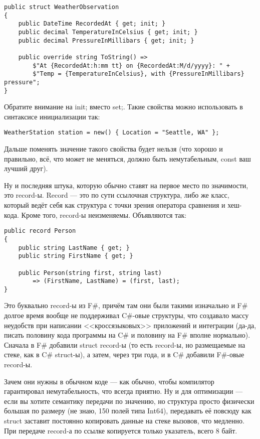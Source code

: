 \documentclass[a5paper]{article}
\begin{document}
\begin{verbatim}
public struct WeatherObservation
{
    public DateTime RecordedAt { get; init; }
    public decimal TemperatureInCelsius { get; init; }
    public decimal PressureInMillibars { get; init; }

    public override string ToString() =>
        $"At {RecordedAt:h:mm tt} on {RecordedAt:M/d/yyyy}: " +
        $"Temp = {TemperatureInCelsius}, with {PressureInMillibars} pressure";
}
\end{verbatim}

Обратите внимание на init; вместо set;. Такие свойства можно использовать в синтаксисе инициализации так:

\begin{verbatim}
WeatherStation station = new() { Location = "Seattle, WA" };
\end{verbatim}

Дальше поменять значение такого свойства будет нельзя (что хорошо и правильно, всё, что может не меняться, должно быть немутабельным, const ваш лучший друг).

Ну и последняя штука, которую обычно ставят на первое место по значимости, это record-ы. Record --- это по сути ссылочная структура, либо же класс, который ведёт себя как структура с точки зрения оператора сравнения и хеш-кода. Кроме того, record-ы неизменяемы. Объявляются так:

\begin{verbatim}
public record Person
{
    public string LastName { get; }
    public string FirstName { get; }

    public Person(string first, string last) 
        => (FirstName, LastName) = (first, last);
}
\end{verbatim}

Это буквально record-ы из F\#, причём там они были такими изначально и F\# долгое время вообще не поддерживал C\#-овые структуры, что создавало массу неудобств при написании <<кроссязыковых>> приложений и интеграции (да-да, писать половину кода программы на C\# и половину на F\# вполне нормально). Сначала в F\# добавили struct record-ы (то есть record-ы, но размещаемые на стеке, как в C\# struct-ы), а затем, через три года, и в C\# добавили F\#-овые record-ы.

Зачем они нужны в обычном коде --- как обычно, чтобы компилятор гарантировал немутабельность, что всегда приятно. Ну и для оптимизации --- если вы хотите семантику передачи по значению, но структура просто физически большая по размеру (не знаю, 150 полей типа Int64), передавать её повсюду как struct заставит постоянно копировать данные на стеке вызовов, что медленно. При передаче record-а по ссылке копируется только указатель, всего 8 байт.
\end{document}
